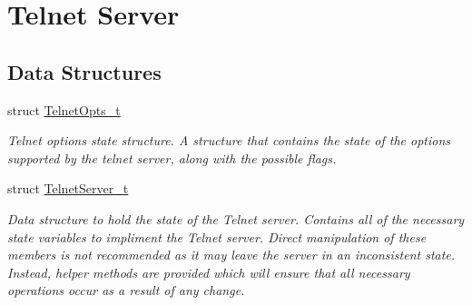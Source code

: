 \hypertarget{group__telnet__server}{\section{Telnet Server}
\label{group__telnet__server}
}
\subsection*{Data Structures}
\begin{DoxyCompactItemize}
\item 
struct \hyperlink{struct_telnet_opts__t}{Telnet\-Opts\-\_\-t}
\begin{DoxyCompactList}\small\item\em Telnet options state structure. A structure that contains the state of the options supported by the telnet server, along with the possible flags. \end{DoxyCompactList}\item 
struct \hyperlink{struct_telnet_server__t}{Telnet\-Server\-\_\-t}
\begin{DoxyCompactList}\small\item\em Data structure to hold the state of the Telnet server. Contains all of the necessary state variables to impliment the Telnet server. Direct manipulation of these members is not recommended as it may leave the server in an inconsistent state. Instead, helper methods are provided which will ensure that all necessary operations occur as a result of any change. \end{DoxyCompactList}\end{DoxyCompactItemize}
